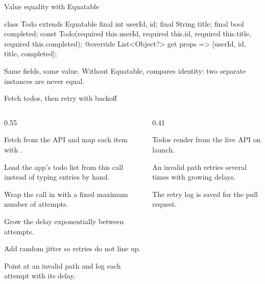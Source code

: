 \documentclass[10pt,aspectratio=169,t]{beamer}
\begin{document}
\begin{frame}[fragile,eyebrow=Reference]{Value equality with Equatable}
\begin{dart}
class Todo extends Equatable {
  final int userId, id;
  final String title;
  final bool completed;
  const Todo({required this.userId,
      required this.id, required this.title,
      required this.completed});
  @override
  List<Object?> get props => [userId, id, title, completed];
}
\end{dart}
  \begin{takeaway}{Same fields, same value.}
    Without Equatable, \code{==} compares identity: two separate instances are never equal.
  \end{takeaway}
\end{frame}

\begin{frame}[eyebrow=Task II]{Fetch todos, then retry with backoff}
  \begin{columns}[T]
    \begin{column}{0.55\textwidth}
      \begin{steps}
        \item Fetch  from the API and map each item with .
        \item Load the app's todo list from this call instead of typing entries by hand.
        \item Wrap the call in  with a fixed maximum number of attempts.
        \item Grow the delay exponentially between attempts.
        \item Add random jitter so retries do not line up.
        \item Point at an invalid path and log each attempt with its delay.
      \end{steps}
    \end{column}
    \begin{column}{0.41\textwidth}
      \begin{checklist}
        \item Todos render from the live API on launch.
        \item An invalid path retries several times with growing delays.
        \item The retry log is saved for the pull request.
      \end{checklist}
    \end{column}
  \end{columns}
\end{frame}
\end{document}
